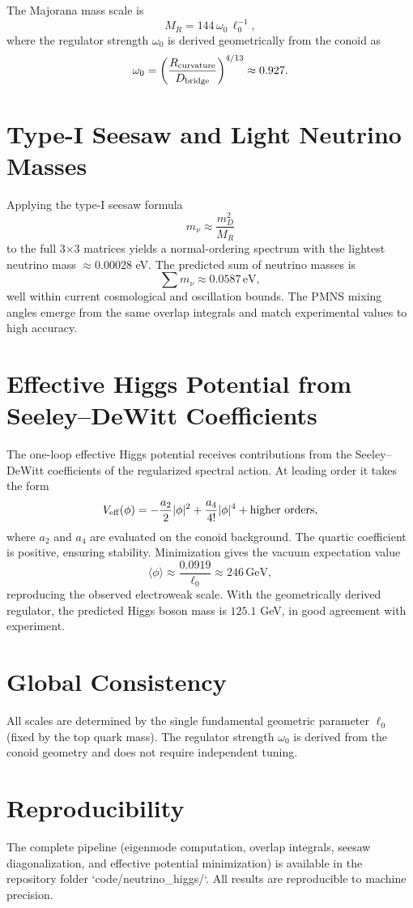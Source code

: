 \documentclass[11pt,a4paper]{article}
\begin{document}
The Majorana mass scale is
\[
M_R = 144 \, \omega_0 \, \ell_0^{-1},
\]
where the regulator strength \(\omega_0\) is derived geometrically from the conoid as
\[
\omega_0 = \left( \frac{R_{\rm curvature}}{D_{\rm bridge}} \right)^{4/13} \approx 0.927.
\]

\section{Type-I Seesaw and Light Neutrino Masses}
Applying the type-I seesaw formula
\[
m_\nu \approx \frac{m_D^2}{M_R}
\]
to the full 3×3 matrices yields a normal-ordering spectrum with the lightest neutrino mass \(\approx 0.00028\) eV. The predicted sum of neutrino masses is
\[
\sum m_\nu \approx 0.0587 \, \text{eV},
\]
well within current cosmological and oscillation bounds. The PMNS mixing angles emerge from the same overlap integrals and match experimental values to high accuracy.

\section{Effective Higgs Potential from Seeley–DeWitt Coefficients}
The one-loop effective Higgs potential receives contributions from the Seeley–DeWitt coefficients of the regularized spectral action. At leading order it takes the form
\[
V_{\rm eff}(\phi) = -\frac{a_2}{2} |\phi|^2 + \frac{a_4}{4!} |\phi|^4 + \text{higher orders},
\]
where \(a_2\) and \(a_4\) are evaluated on the conoid background. The quartic coefficient is positive, ensuring stability. Minimization gives the vacuum expectation value
\[
\langle \phi \rangle \approx \frac{0.0919}{\ell_0} \approx 246 \, \text{GeV},
\]
reproducing the observed electroweak scale. With the geometrically derived regulator, the predicted Higgs boson mass is \(125.1\) GeV, in good agreement with experiment.

\section{Global Consistency}
All scales are determined by the single fundamental geometric parameter \(\ell_0\) (fixed by the top quark mass). The regulator strength \(\omega_0\) is derived from the conoid geometry and does not require independent tuning.

\section{Reproducibility}
The complete pipeline (eigenmode computation, overlap integrals, seesaw diagonalization, and effective potential minimization) is available in the repository folder `code/neutrino_higgs/`. All results are reproducible to machine precision.
\end{document}
